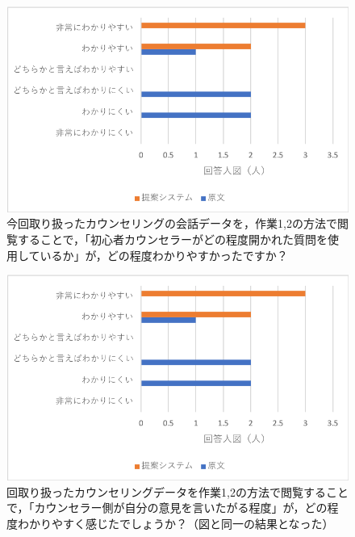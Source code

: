 \documentclass[shuuron]{kuee}
\begin{document}
\begin{figure}
  \begin{center}
    \includegraphics[width=\linewidth]{q1.png}
  \end{center}
  \caption{今回取り扱ったカウンセリングの会話データを，作業1,2の方法で閲覧することで，「初心者カウンセラーがどの程度開かれた質問を使用しているか」が，どの程度わかりやすかったですか？}
  \label{fig:q1}
\end{figure}

\begin{figure}
  \begin{center}
     \includegraphics[width=\linewidth]{q1.png}
  \end{center}
  \caption{回取り扱ったカウンセリングデータを作業1,2の方法で閲覧することで，「カウンセラー側が自分の意見を言いたがる程度」が，どの程度わかりやすく感じたでしょうか？（図\label{fig:q1}と同一の結果となった）}
  \label{fig:q1}
\end{figure}
\end{document}
